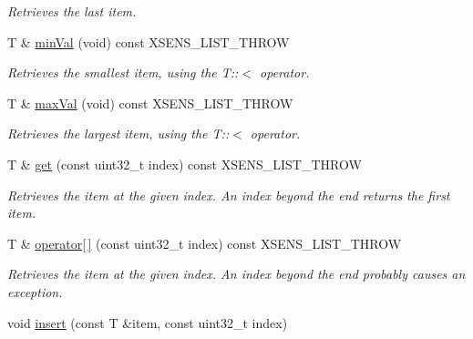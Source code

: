 \begin{DoxyCompactItemize}
\begin{DoxyCompactList}\small\item\em \-Retrieves the last item. \end{DoxyCompactList}\item 
\hypertarget{classxsens_1_1List_a290f6fb32b2f720a3a155bb35b1388ee}{\-T \& \hyperlink{classxsens_1_1List_a290f6fb32b2f720a3a155bb35b1388ee}{min\-Val} (void) const \-X\-S\-E\-N\-S\-\_\-\-L\-I\-S\-T\-\_\-\-T\-H\-R\-O\-W}\label{classxsens_1_1List_a290f6fb32b2f720a3a155bb35b1388ee}

\begin{DoxyCompactList}\small\item\em \-Retrieves the smallest item, using the \-T\-:\-:$<$ operator. \end{DoxyCompactList}\item 
\hypertarget{classxsens_1_1List_a46dde0d7be93aa3814e237cf1b8155cd}{\-T \& \hyperlink{classxsens_1_1List_a46dde0d7be93aa3814e237cf1b8155cd}{max\-Val} (void) const \-X\-S\-E\-N\-S\-\_\-\-L\-I\-S\-T\-\_\-\-T\-H\-R\-O\-W}\label{classxsens_1_1List_a46dde0d7be93aa3814e237cf1b8155cd}

\begin{DoxyCompactList}\small\item\em \-Retrieves the largest item, using the \-T\-:\-:$<$ operator. \end{DoxyCompactList}\item 
\hypertarget{classxsens_1_1List_a18b3674e4bd954cad2a7e60239ab134f}{\-T \& \hyperlink{classxsens_1_1List_a18b3674e4bd954cad2a7e60239ab134f}{get} (const uint32\-\_\-t index) const \-X\-S\-E\-N\-S\-\_\-\-L\-I\-S\-T\-\_\-\-T\-H\-R\-O\-W}\label{classxsens_1_1List_a18b3674e4bd954cad2a7e60239ab134f}

\begin{DoxyCompactList}\small\item\em \-Retrieves the item at the given index. \-An index beyond the end returns the first item. \end{DoxyCompactList}\item 
\hypertarget{classxsens_1_1List_a16365f85f112db1d51949602b6465b71}{\-T \& \hyperlink{classxsens_1_1List_a16365f85f112db1d51949602b6465b71}{operator\mbox{[}$\,$\mbox{]}} (const uint32\-\_\-t index) const \-X\-S\-E\-N\-S\-\_\-\-L\-I\-S\-T\-\_\-\-T\-H\-R\-O\-W}\label{classxsens_1_1List_a16365f85f112db1d51949602b6465b71}

\begin{DoxyCompactList}\small\item\em \-Retrieves the item at the given index. \-An index beyond the end probably causes an exception. \end{DoxyCompactList}\item 
\hypertarget{classxsens_1_1List_acea873e2e494c15a4f7370a68b1010ee}{void \hyperlink{classxsens_1_1List_acea873e2e494c15a4f7370a68b1010ee}{insert} (const \-T \&item, const uint32\-\_\-t index)}\label{classxsens_1_1List_acea873e2e494c15a4f7370a68b1010ee}


\end{DoxyCompactItemize}
